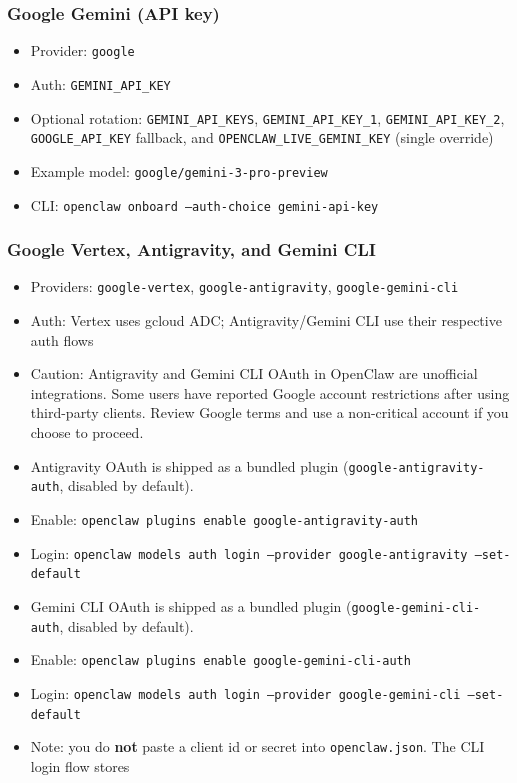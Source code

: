 \subsubsection{Google Gemini (API key)}


\begin{itemize}
  \item Provider: \texttt{google}
  \item Auth: \texttt{GEMINI\_API\_KEY}
  \item Optional rotation: \texttt{GEMINI\_API\_KEYS}, \texttt{GEMINI\_API\_KEY\_1}, \texttt{GEMINI\_API\_KEY\_2}, \texttt{GOOGLE\_API\_KEY} fallback, and \texttt{OPENCLAW\_LIVE\_GEMINI\_KEY} (single override)
  \item Example model: \texttt{google/gemini-3-pro-preview}
  \item CLI: \texttt{openclaw onboard --auth-choice gemini-api-key}
\end{itemize}


\subsubsection{Google Vertex, Antigravity, and Gemini CLI}


\begin{itemize}
  \item Providers: \texttt{google-vertex}, \texttt{google-antigravity}, \texttt{google-gemini-cli}
  \item Auth: Vertex uses gcloud ADC; Antigravity/Gemini CLI use their respective auth flows
  \item Caution: Antigravity and Gemini CLI OAuth in OpenClaw are unofficial integrations. Some users have reported Google account restrictions after using third-party clients. Review Google terms and use a non-critical account if you choose to proceed.
  \item Antigravity OAuth is shipped as a bundled plugin (\texttt{google-antigravity-auth}, disabled by default).
  \item Enable: \texttt{openclaw plugins enable google-antigravity-auth}
  \item Login: \texttt{openclaw models auth login --provider google-antigravity --set-default}
  \item Gemini CLI OAuth is shipped as a bundled plugin (\texttt{google-gemini-cli-auth}, disabled by default).
  \item Enable: \texttt{openclaw plugins enable google-gemini-cli-auth}
  \item Login: \texttt{openclaw models auth login --provider google-gemini-cli --set-default}
  \item Note: you do \textbf{not} paste a client id or secret into \texttt{openclaw.json}. The CLI login flow stores
\end{itemize}

